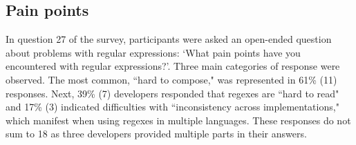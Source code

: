 \subsection{Pain points}
\label{sec:painPoints}
In question 27 of the survey, participants were asked an open-ended question about problems with regular expressions: `What pain points have you encountered with regular expressions?'.  Three main categories of response were observed. The most common, ``hard to compose," was represented in 61\% (11) responses. Next, 39\% (7) developers responded that regexes are ``hard to read" and 17\% (3) indicated difficulties with ``inconsistency across implementations," which manifest when using regexes in multiple languages. These responses do not sum to 18 as three developers provided multiple parts in their answers.


